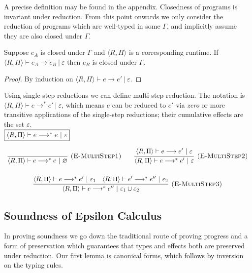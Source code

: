 \documentclass[a4paper,UKenglish]{lipics-v2016}
\newcommand{\singlestep}[0]{ \longrightarrow }
\newcommand{\multistep}[0]{ \longrightarrow^{*}}
\newcommand{\rctx}[0]{ \langle R, \Pi \rangle }
\begin{document}
\noindent
A precise definition may be found in the appendix. Closedness of programs is invariant under reduction. From this point onwards we only consider the reduction of programs which are well-typed in some $\Gamma$, and implicitly assume they are also closed under $\Gamma$.

\begin{lemma}[Closedness]
Suppose $e_A$ is closed under $\Gamma$ and $\rctx$ is a corresponding runtime. If $\rctx \vdash e_A \longrightarrow e_B~|~\varepsilon$ then $e_B$ is closed under $\Gamma$.
\end{lemma}
\begin{proof}
By induction on $\rctx \vdash e \longrightarrow e'~|~\varepsilon$.
\end{proof}

\noindent
Using single-step reductions we can define multi-step reduction. The notation is $\rctx \vdash e \longrightarrow^{*} e'~|~\varepsilon$, which means $e$ can be reduced to $e'$ via \textit{zero} or more transitive applications of the single-step reductions; their cumulative effects are the set $\varepsilon$. \\

\noindent
$\fbox{$\rctx \vdash e \multistep e~|~\varepsilon$}$

\[
\begin{array}{c}
\infer[\textsc{(E-MultiStep1)}]
	{\rctx \vdash e \multistep e~|~\varnothing}
	{}
	
~~~~~~

\infer[\textsc{(E-MultiStep2)}]
	{\rctx \vdash e \multistep e'~|~\varepsilon}
	{\rctx \vdash e \singlestep e'~|~\varepsilon} \\[4ex]
	
\infer[\textsc{(E-MultiStep3)}]
	{\rctx \vdash e \multistep e''~|~\varepsilon_1 \cup \varepsilon_2}
	{\rctx \vdash e \multistep e'~|~\varepsilon_1 & \rctx \vdash e' \multistep e''~|~\varepsilon_2}
	
\end{array}
\]

\subsection{Soundness of Epsilon Calculus}

In proving soundness we go down the traditional route of proving progress and a form of preservation which guarantees that types and effects both are preserved under reduction. Our first lemma is canonical forms, which follows by inversion on the typing rules.
\end{document}
